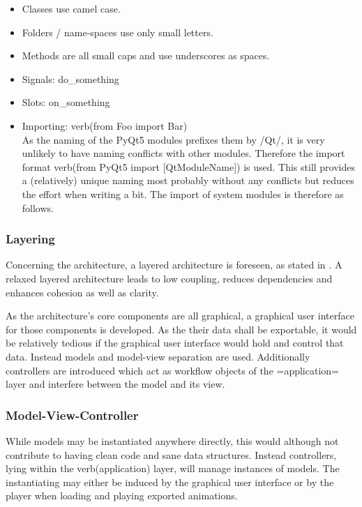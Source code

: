 \documentclass[
    a4paper,      %
    10pt,         %
    openright,    %
    notitlepage,  %
    parskip=half, %
]{scrreprt}       %
\theoremstyle{definition}                    %
\begin{document}
\begin{itemize}
\item Classes use camel case.
\item Folders / name-spaces use only small letters.
\item Methods are all small caps and use underscores as spaces.
\item Signals: do\_something
\item Slots: on\_something
\item Importing: {{{verb(from Foo import Bar)}}}\\
      As the naming of the PyQt5 modules prefixes them by /Qt/, it is very
      unlikely to have naming conflicts with other modules. Therefore the import
      format {{{verb(from PyQt5 import [QtModuleName])}}} is used. This still
      provides a (relatively) unique naming most probably without any conflicts
      but reduces the effort when writing a bit. The import of system modules is
      therefore as follows.
\end{itemize}

\subsubsection{Layering}
\label{ssubsec:layering}

Concerning the architecture, a layered architecture is foreseen, as stated in
\cite[p. 38 ff.]{osterwalder_qde_2016}. A relaxed layered architecture leads to
low coupling, reduces dependencies and enhances cohesion as well as clarity.

As the architecture's core  components are all graphical, a graphical user
interface for those components is developed. As the their data shall be
exportable, it would be relatively tedious if the graphical user interface would
hold and control that data. Instead models and model-view separation are used.
Additionally controllers are introduced which act as workflow objects of the
=application= layer and interfere between the model and its view.

\subsubsection{Model-View-Controller}
\label{ssubsec:mvc}

While models may be instantiated anywhere directly, this would although not
contribute to having clean code and sane data structures. Instead controllers,
lying within the {{{verb(application)}}} layer, will manage instances of models.
The instantiating may either be induced by the graphical user interface
or by the player when loading and playing exported animations.
\end{document}
